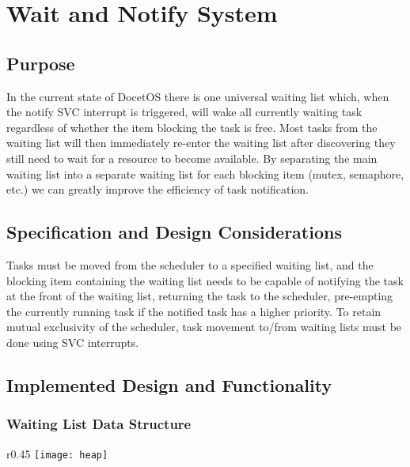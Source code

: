 \section{Wait and Notify System}
\subsection{Purpose}
In the current state of DocetOS there is one universal waiting list which, when the notify SVC interrupt is triggered, will wake all currently waiting task regardless of whether the item blocking the task is free. Most tasks from the waiting list will then immediately re-enter the waiting list after discovering they still need to wait for a resource to become available. By separating the main waiting list into a separate waiting list for each blocking item (mutex, semaphore, etc.) we can greatly improve the efficiency of task notification.

\subsection{Specification and Design Considerations}
Tasks must be moved from the scheduler to a specified waiting list, and the blocking item containing the waiting list needs to be capable of notifying the task at the front of the waiting list, returning the task to the scheduler, pre-empting the currently running task if the notified task has a higher priority. To retain mutual exclusivity of the scheduler, task movement to/from waiting lists must be done using SVC interrupts.
\pagebreak
\subsection{Implemented Design and Functionality}
\subsubsection{Waiting List Data Structure}

\begin{wrapfigure}{r}{0.45\textwidth}
	\centering
	\vspace{-\baselineskip}
	\texttt{[image: heap]}
\end{wrapfigure}

